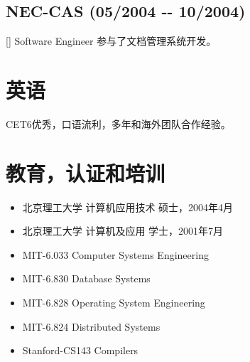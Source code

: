 \documentclass[a4paper]{article}
\newenvironment{DUlineblock}[1]{%
    \list{}{\setlength{\partopsep}{\parskip}
            \addtolength{\partopsep}{\baselineskip}
            \setlength{\topsep}{0pt}
            \setlength{\itemsep}{0.15\baselineskip}
            \setlength{\parsep}{0pt}
            \setlength{\leftmargin}{#1}}
    \raggedright
  }
  {\endlist}
\begin{document}
\begin{CJK}{UTF8}{gkai}
\subsection*{NEC-CAS (05/2004 -{}- 10/2004)}
\begin{DUlineblock}{0em}
\item[] Software Engineer
\end{DUlineblock}
参与了文档管理系统开发。

\section*{英语}
CET6优秀，口语流利，多年和海外团队合作经验。

\section*{教育，认证和培训}
\begin{itemize}
\item 北京理工大学       计算机应用技术            硕士，2004年4月
\item 北京理工大学       计算机及应用                学士，2001年7月
\item MIT-6.033 Computer Systems Engineering
\item MIT-6.830 Database Systems
\item MIT-6.828 Operating System Engineering
\item MIT-6.824 Distributed Systems
\item Stanford-CS143 Compilers
\end{itemize}

\end{CJK}
\end{document}
